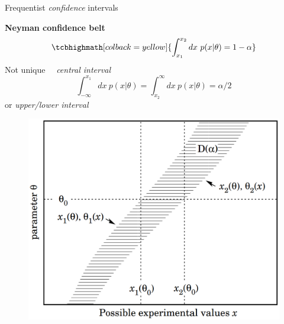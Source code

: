 \documentclass[
aspectratio=169,
14pt,
professionalfonts
]{beamer}
\newcommand{\arrow}{~\ding{220}~}
\begin{document}
\begin{frame}{Frequentist \textit{confidence} intervals}

\begin{minipage}[t]{0.55\linewidth}
\textbf{Neyman confidence belt}
$$
\tcbhighmath[colback=yellow]{
\int_{x_1}^{x_2} dx ~ p(x|\theta) = 1-\alpha
}
$$
Not unique \arrow \textit{central interval}
\small
$$
\int_{-\infty}^{x_1} dx ~ p(x|\theta)=  \int_{x_2}^{\infty} dx ~ p(x|\theta) = \alpha/2
$$
\normalsize
or \textit{upper/lower interval}
\end{minipage}
\begin{minipage}[t]{0.44\linewidth}
    \begin{figure}
        \centering
        \includegraphics[width=\linewidth]{../plots/neyman.png}
    \end{figure}
\end{minipage}
\end{frame}
\end{document}

